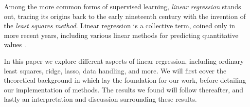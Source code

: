 Among the more common forms of supervised learning, \textit{linear regression} stands out, tracing its origins back to the early nineteenth century with the invention of the \textit{least squares method}. 
Linear regression is a collective term, coined only in more recent years, including various linear methods for predicting quantitative values \citep[ p.~5]{james}. 


In this paper we explore different aspects of linear regression, including ordinary least squares, ridge, lasso, data handling, and more. 
We will first cover the theoretical background in which lay the foundation for our work, before detailing our implementation of methods. 
The results we found will follow thereafter, and lastly an interpretation and discussion surrounding these results. 


